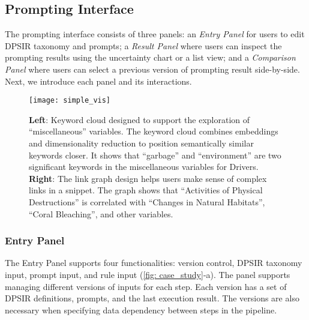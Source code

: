 \vspace*{-0.1cm}
\subsection{Prompting Interface}
The prompting interface consists of three panels: an \textit{Entry Panel} for users to edit DPSIR taxonomy and prompts; a \textit{Result Panel} where users can inspect the prompting results using the uncertainty chart or a list view; and a \textit{Comparison Panel} where users can select a previous version of prompting result side-by-side.
Next, we introduce each panel and its interactions. 


\begin{figure*}[t]
    \centering
    \texttt{[image: simple\_vis]}
    \caption{\textbf{Left}: Keyword cloud designed to support the exploration of ``miscellaneous'' variables. The keyword cloud combines embeddings and dimensionality reduction to position semantically similar keywords closer. It shows that ``garbage'' and ``environment'' are two significant keywords in the miscellaneous variables for Drivers. \textbf{Right}: The link graph design helps users make sense of complex links in a snippet. The graph shows that ``Activities of Physical Destructions'' is correlated with ``Changes in Natural Habitats'', ``Coral Bleaching'', and other variables.}
    \label{fig: simple_vis}
    \vspace*{-0.5cm}
\end{figure*}

\vspace*{-0.15cm}
\subsubsection{Entry Panel}
The Entry Panel supports four functionalities: version control, DPSIR taxonomy input, prompt input, and rule input (\autoref{fig: case_study}-a). The panel supports managing different versions of inputs for each step. Each version has a set of DPSIR definitions, prompts, and the last execution result. 
The versions are also necessary when specifying data dependency between steps in the pipeline.
\vspace*{-0.1cm}
